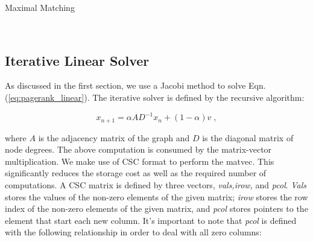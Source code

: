 \documentclass[11pt]{article}
\newcommand{\noi}{\noindent}
\begin{document}
	\begin{algorithm}[H]
        \small
	\caption{Maximal Matching}\label{alg:mxm}
	\begin{algorithmic}[1]
        \\
        
        \EndParFor

        \EndIf
        \EndParFor

        \EndFor
        
        \EndProcedure
        \end{algorithmic}
        \end{algorithm} 





\subsection{Iterative Linear Solver}

As discussed in the first section, we use a Jacobi method to solve Eqn.
(\ref{eq:pagerank_linear}). The iterative solver is defined by the recursive
algorithm:

\begin{equation*}
	x_{n+1} = \alpha AD^{-1}x_{n}+(1-\alpha)v \; , 
\end{equation*}

\noi where $A$ is the adjacency matrix of the graph and $D$ is the diagonal
matrix of node degrees. The above computation is consumed by the matrix-vector
multiplication. We make use of CSC format to perform the matvec. This
significantly reduces the storage cost as well as the required number of
computations. A CSC matrix is defined by three vectors, \textit{vals,irow,} and
\textit{pcol}. \textit{Vals} stores the values of the non-zero elements of the
given matrix; \textit{irow} stores the row index of the non-zero elements of the
given matrix, and \textit{pcol} stores pointers to the element that start each
new column. It's important to note that \textit{pcol} is defined with the
following relationship in order to deal with all zero columns: 
\end{document}
